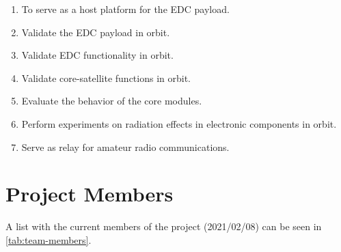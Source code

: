 \begin{enumerate}
    \item To serve as a host platform for the EDC payload.
    \item Validate the EDC payload in orbit.
    \item Validate EDC functionality in orbit.
    \item Validate core-satellite functions in orbit.
    \item Evaluate the behavior of the core modules.
    \item Perform experiments on radiation effects in electronic components in orbit.
    \item Serve as relay for amateur radio communications.
\end{enumerate}

\section{Project Members}

A list with the current members of the project (2021/02/08) can be seen in \autoref{tab:team-members}.

